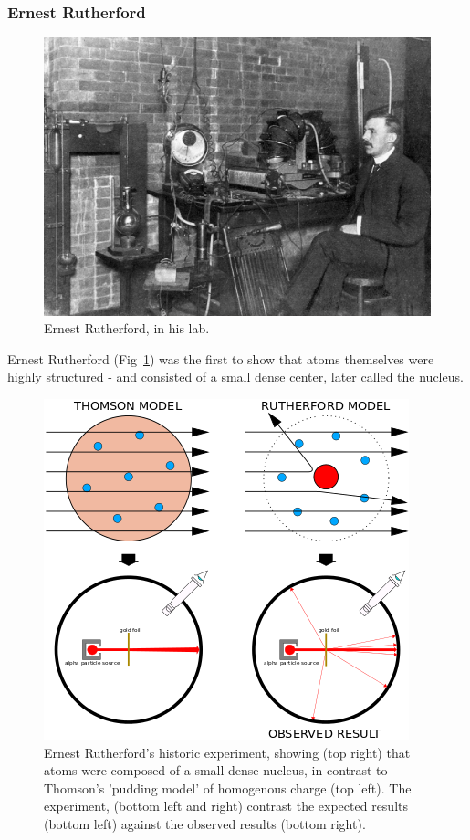 \subsubsection{Ernest Rutherford}

\begin{figure}[ht]
	\centering
	\includegraphics[width=0.6\linewidth]{../Chapter2/fig/ernestrutherford.jpg}
	\caption{Ernest Rutherford, in his lab.}
	\label{fig:rutherford}
\end{figure}

Ernest Rutherford (Fig~\ref{fig:rutherford}) was the first to show that atoms
themselves were highly structured - and consisted of a small dense center, later
called the nucleus.

\begin{figure}[ht]
	\centering
	\includegraphics[width=0.6\linewidth]{../Chapter2/fig/geiger_marsden.png}
	\caption{
		Ernest Rutherford's historic experiment, showing (top right) that atoms were
		composed of a small dense nucleus, in contrast to Thomson's 'pudding model'
		of homogenous charge (top left). The experiment, (bottom left and right)
		contrast the expected results (bottom left) against the observed results
		(bottom right).
	}
	\label{fig:geigermarsden}
\end{figure}


